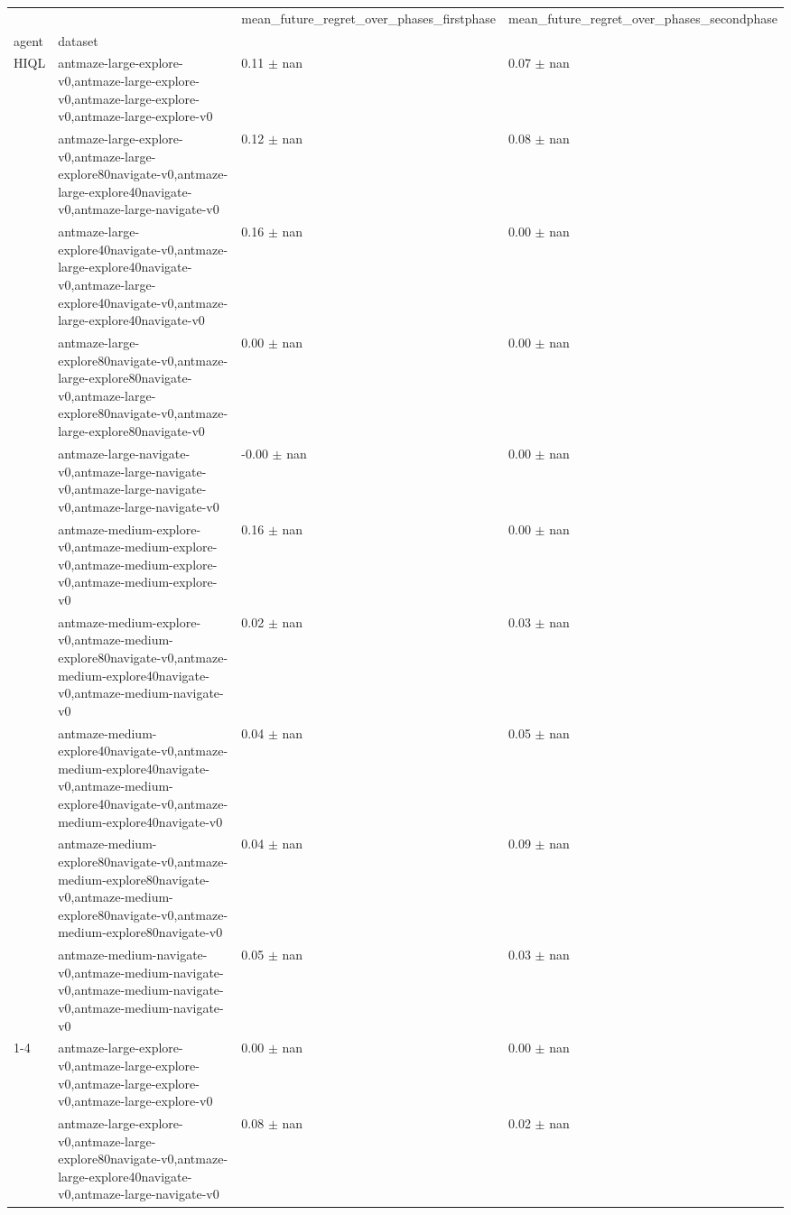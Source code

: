 \begin{tabular}{llll}
\toprule
 &  & mean_future_regret_over_phases_firstphase & mean_future_regret_over_phases_secondphase \\
agent & dataset &  &  \\
\midrule
\multirow[t]{10}{*}{HIQL} & antmaze-large-explore-v0,antmaze-large-explore-v0,antmaze-large-explore-v0,antmaze-large-explore-v0 & 0.11 $\pm$ nan & 0.07 $\pm$ nan \\
 & antmaze-large-explore-v0,antmaze-large-explore80navigate-v0,antmaze-large-explore40navigate-v0,antmaze-large-navigate-v0 & 0.12 $\pm$ nan & 0.08 $\pm$ nan \\
 & antmaze-large-explore40navigate-v0,antmaze-large-explore40navigate-v0,antmaze-large-explore40navigate-v0,antmaze-large-explore40navigate-v0 & 0.16 $\pm$ nan & 0.00 $\pm$ nan \\
 & antmaze-large-explore80navigate-v0,antmaze-large-explore80navigate-v0,antmaze-large-explore80navigate-v0,antmaze-large-explore80navigate-v0 & 0.00 $\pm$ nan & 0.00 $\pm$ nan \\
 & antmaze-large-navigate-v0,antmaze-large-navigate-v0,antmaze-large-navigate-v0,antmaze-large-navigate-v0 & -0.00 $\pm$ nan & 0.00 $\pm$ nan \\
 & antmaze-medium-explore-v0,antmaze-medium-explore-v0,antmaze-medium-explore-v0,antmaze-medium-explore-v0 & 0.16 $\pm$ nan & 0.00 $\pm$ nan \\
 & antmaze-medium-explore-v0,antmaze-medium-explore80navigate-v0,antmaze-medium-explore40navigate-v0,antmaze-medium-navigate-v0 & 0.02 $\pm$ nan & 0.03 $\pm$ nan \\
 & antmaze-medium-explore40navigate-v0,antmaze-medium-explore40navigate-v0,antmaze-medium-explore40navigate-v0,antmaze-medium-explore40navigate-v0 & 0.04 $\pm$ nan & 0.05 $\pm$ nan \\
 & antmaze-medium-explore80navigate-v0,antmaze-medium-explore80navigate-v0,antmaze-medium-explore80navigate-v0,antmaze-medium-explore80navigate-v0 & 0.04 $\pm$ nan & 0.09 $\pm$ nan \\
 & antmaze-medium-navigate-v0,antmaze-medium-navigate-v0,antmaze-medium-navigate-v0,antmaze-medium-navigate-v0 & 0.05 $\pm$ nan & 0.03 $\pm$ nan \\
\cline{1-4}
\multirow[t]{10}{*}{QRL} & antmaze-large-explore-v0,antmaze-large-explore-v0,antmaze-large-explore-v0,antmaze-large-explore-v0 & 0.00 $\pm$ nan & 0.00 $\pm$ nan \\
 & antmaze-large-explore-v0,antmaze-large-explore80navigate-v0,antmaze-large-explore40navigate-v0,antmaze-large-navigate-v0 & 0.08 $\pm$ nan & 0.02 $\pm$ nan \\

\end{tabular}
